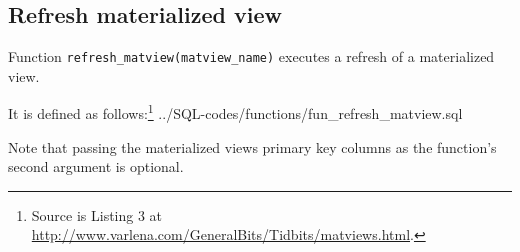 \subsection{Refresh materialized view}\label{subsec_appx_fun_refresh_matview}

Function \texttt{refresh\_matview(matview\_name)} executes a refresh of a materialized view.

It is defined as follows:\footnote{Source is Listing 3 at \url{http://www.varlena.com/GeneralBits/Tidbits/matviews.html}.} 
%
{../SQL-codes/functions/fun_refresh_matview.sql}

Note that passing the materialized views primary key columns as the function's second argument is optional. 

